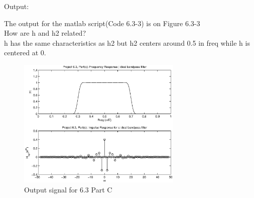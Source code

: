 {\LARGE Output:}\newline

The output for the matlab script(Code 6.3-3) is on Figure 6.3-3 \\

How are h and h2 related?\\

h has the same characteristics as h2 but h2 centers around 0.5 in freq while h is centered at 0.\\

\begin{figure}[h!]
  \centering
    \includegraphics[width=0.7\textwidth]{Part2/Output/Figures/proj63PartC.eps}
  \caption{Output signal for 6.3 Part C}
\end{figure}
\pagebreak
